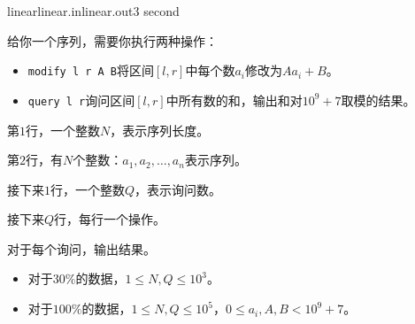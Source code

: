 \documentclass[11pt,a4paper,oneside]{article}
\begin{document}
\begin{problem}{linear}{linear.in}{linear.out}{3 second} 
	
	给你一个序列，需要你执行两种操作：
	
	\begin{itemize}
		\item \verb|modify l r A B|将区间$[l,r]$中每个数$a_i$修改为$Aa_i+B$。
		\item \verb|query l r|询问区间$[l,r]$中所有数的和，输出和对$10^9+7$取模的结果。
	\end{itemize}
	
    \InputFile
    
    第$1$行，一个整数$N$，表示序列长度。
    
    第$2$行，有$N$个整数：$a_1,a_2,\dots,a_n$表示序列。
    
    接下来$1$行，一个整数$Q$，表示询问数。
    
    接下来$Q$行，每行一个操作。

    \OutputFile

	对于每个询问，输出结果。

    \Example

    \begin{example}
    \end{example}

    \Note
    
    \begin{itemize}
		\item 对于$30\%$的数据，$1 \leq N, Q \leq 10^3$。
		\item 对于$100\%$的数据，$1 \leq N, Q \leq 10^5$，$0 \leq a_i, A, B < 10^9+7$。
    \end{itemize}

\end{problem}
\end{document}
